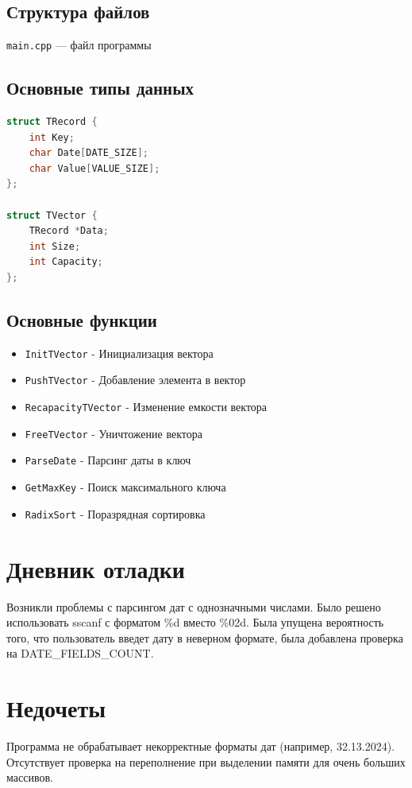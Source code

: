 \documentclass[12pt, a4paper]{article}
\begin{document}
\subsection{Структура файлов}
\texttt{main.cpp} — файл программы

\subsection{Основные типы данных}
\begin{lstlisting}[language=C++, caption={Структуры}]
struct TRecord {
    int Key;
    char Date[DATE_SIZE];
    char Value[VALUE_SIZE];
};

struct TVector {
    TRecord *Data;
    int Size;
    int Capacity;
};
\end{lstlisting}

\subsection{Основные функции}
\begin{itemize}
    \item \texttt{InitTVector} - Инициализация вектора
    \item \texttt{PushTVector} - Добавление элемента в вектор
    \item \texttt{RecapacityTVector} - Изменение емкости вектора
    \item \texttt{FreeTVector} - Уничтожение вектора
    \item \texttt{ParseDate} - Парсинг даты в ключ
    \item \texttt{GetMaxKey} - Поиск максимального ключа
    \item \texttt{RadixSort} - Поразрядная сортировка
\end{itemize}

\section{Дневник отладки}
Возникли проблемы с парсингом дат с однозначными числами. Было решено использовать sscanf с форматом \%d вместо \%02d. Была упущена вероятность того, что пользователь введет дату в неверном формате, была добавлена проверка на DATE\_FIELDS\_COUNT.

\section{Недочеты}

Программа не обрабатывает некорректные форматы дат (например, 32.13.2024). Отсутствует проверка на переполнение при выделении памяти для очень больших массивов.
\end{document}
